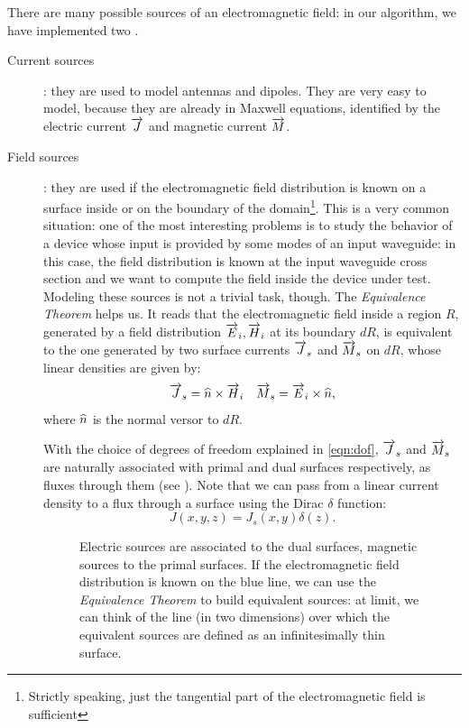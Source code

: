 There are many possible sources of an electromagnetic field: in our
algorithm, we have implemented two \cite{bolla_piers}.
\begin{description}
\item[Current sources]: they are used to model antennas and
  dipoles. They are very easy to model, because they are already in
  Maxwell equations, identified by the electric current $\overrightarrow{J}$ and
  magnetic current $\overrightarrow{M}$.
\item[Field sources]: they are used if the electromagnetic field
  distribution is known on a surface inside or on the boundary of the
  domain\footnote{Strictly speaking, just the tangential part of the
  electromagnetic field is sufficient}. This is a very common
  situation: one of the most interesting problems is to study the
  behavior of a device whose input is provided by some modes of an
  input waveguide: in this case, the field distribution is known at
  the input waveguide cross section and we want to compute the field
  inside the device under test. Modeling these sources is not a
  trivial task, though. The \emph{Equivalence Theorem}
  \cite{someda_electromagnetic} helps us. It reads that the
  electromagnetic field inside a region $R$, generated by a field
  distribution ${\overrightarrow{E}_i,\overrightarrow{H}_i}$ at its boundary $dR$, is equivalent to
  the one generated by two surface currents $\overrightarrow{J}_s$ and $\overrightarrow{M}_s$ on $dR$,
  whose linear densities are given by:
  \begin{align*}
    \overrightarrow{J}_s = {\widehat{n} \times \overrightarrow{H}_i} && \overrightarrow{M}_s = {\overrightarrow{E}_i \times \widehat{n}} ,
  \end{align*}
  where $\widehat{n}$ is the normal versor to $dR$.
  
  With the choice of degrees of freedom explained in \eqref{eqn:dof}, $\overrightarrow{J}_s$ and $\overrightarrow{M}_s$
  are naturally associated with primal and dual surfaces respectively,
  as fluxes through them (see ). Note that we can
  pass from a linear current density to a flux through a surface using
  the Dirac $\delta$ function:
  \begin{equation*}
    J(x,y,z) = J_s(x,y) \delta(z).
  \end{equation*}
  
  \begin{figure}[htbp]
    \begin{center}
      \resizebox{6cm}{!}{}
    \end{center}
    \caption{Electric sources are associated to the dual surfaces,
      magnetic sources to the primal surfaces. If the electromagnetic
      field distribution is known on the blue line, we can use the
      \emph{Equivalence Theorem} to build equivalent sources: at
      limit, we can think of the line (in two dimensions) over which
      the equivalent sources are defined as an infinitesimally thin
      surface.}
    \label{fig:sources}
  \end{figure}


\end{description}
